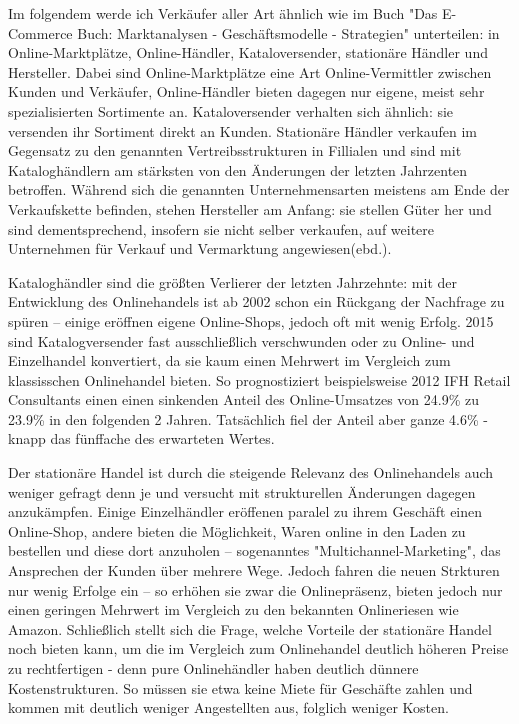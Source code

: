Im folgendem werde ich Verkäufer aller Art ähnlich wie im Buch "Das E-Commerce Buch: Marktanalysen - Geschäftsmodelle - Strategien" unterteilen: in Online-Marktplätze, Online-Händler, Kataloversender, stationäre Händler und Hersteller\cite[S. 15ff]{Graf}. Dabei sind Online-Marktplätze eine Art Online-Vermittler zwischen Kunden und Verkäufer, Online-Händler bieten dagegen nur eigene, meist sehr spezialisierten Sortimente an. Kataloversender verhalten sich ähnlich: sie versenden ihr Sortiment direkt an Kunden. Stationäre Händler verkaufen im Gegensatz zu den genannten Vertreibsstrukturen in Fillialen und sind mit Kataloghändlern am stärksten von den Änderungen der letzten Jahrzenten betroffen. Während sich die genannten Unternehmensarten meistens am Ende der Verkaufskette befinden, stehen Hersteller am Anfang: sie stellen Güter her und sind dementsprechend, insofern sie nicht selber verkaufen, auf weitere Unternehmen für Verkauf und Vermarktung angewiesen(ebd.). %


Kataloghändler sind die größten Verlierer der letzten Jahrzehnte: mit der Entwicklung des Onlinehandels ist ab 2002 schon ein Rückgang der Nachfrage zu spüren – einige eröffnen eigene Online-Shops\cite[S. 24f]{Graf}, jedoch oft mit wenig Erfolg\cite[S. 38]{Graf}. 2015 sind Katalogversender fast ausschließlich verschwunden oder zu Online- und Einzelhandel konvertiert, da sie kaum einen Mehrwert im Vergleich zum klassisschen Onlinehandel bieten\cite[S. 47]{Graf}. So prognostiziert beispielsweise 2012 IFH Retail Consultants einen einen sinkenden Anteil des Online-Umsatzes von 24.9\% zu 23.9\% in den folgenden 2 Jahren\cite[S. 20]{evilcom}. Tatsächlich fiel der Anteil aber ganze 4.6\% - knapp das fünffache des erwarteten Wertes\cite{statista-vertriebsformen}. %

Der stationäre Handel ist durch die steigende Relevanz des Onlinehandels auch weniger gefragt denn je und versucht mit strukturellen Änderungen dagegen anzukämpfen. Einige Einzelhändler eröffenen paralel zu ihrem Geschäft einen Online-Shop, andere bieten die Möglichkeit, Waren online in den Laden zu bestellen und diese dort anzuholen – sogenanntes "Multichannel-Marketing", das Ansprechen der Kunden über mehrere Wege\cite[S. 34f]{Graf}. Jedoch fahren die neuen Strkturen nur wenig Erfolge ein – so erhöhen sie zwar die Onlinepräsenz, bieten jedoch nur einen geringen Mehrwert im Vergleich zu den bekannten Onlineriesen wie Amazon\cite[S. 34f]{Graf}. 
Schließlich stellt sich die Frage, welche Vorteile der stationäre Handel noch bieten kann, um die im Vergleich zum Onlinehandel deutlich höheren Preise zu rechtfertigen - denn pure Onlinehändler haben deutlich dünnere Kostenstrukturen\cite[S. 14]{evilcom}. So müssen sie etwa keine Miete für Geschäfte zahlen und kommen mit deutlich weniger Angestellten aus, folglich weniger Kosten.

